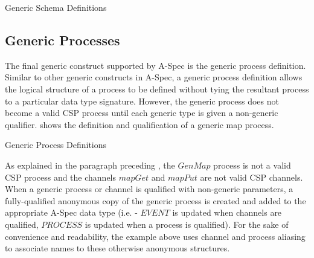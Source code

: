 \documentclass[letterpaper,10pt,draft]{book}
\begin{document}
\begin{example}
\begin{minipage}[t]{0.49\linewidth}
   
\end{minipage}
\begin{minipage}[t]{0.49\linewidth}
   \azed
   
\end{minipage}

   \caption{Generic Schema Definitions}
   \label{ex:GenSch}
\end{example}

\subsection{Generic Processes}
   \label{sect:GenProc}

The final generic construct supported by A-Spec is the generic process definition.
Similar to other generic constructs in A-Spec, a generic process definition allows
the logical structure of a process to be defined without tying the resultant process
to a particular data type signature.  However, the generic process does not become
a valid CSP process until each generic type is given a non-generic qualifier.
 shows the definition and qualification of a generic map process.

\begin{example}
\begin{minipage}[t]{0.49\linewidth}
   
\end{minipage}
\begin{minipage}[t]{0.49\linewidth}
   \azed
   
\end{minipage}

   \caption{Generic Process Definitions}
   \label{ex:GenProc}
\end{example}

As explained in the paragraph preceding , the $GenMap$ process
is not a valid CSP process and the channels $mapGet$ and $mapPut$ are not valid
CSP channels.  When a generic process or channel is qualified with non-generic parameters,
a fully-qualified anonymous copy of the generic process  is created and added to
the appropriate A-Spec data type (i.e. - $EVENT$ is updated when channels are qualified,
$PROCESS$ is updated when a process is qualified).  For the sake of convenience
and readability, the example above uses channel and process aliasing to associate
names to these otherwise anonymous structures.
\end{document}

